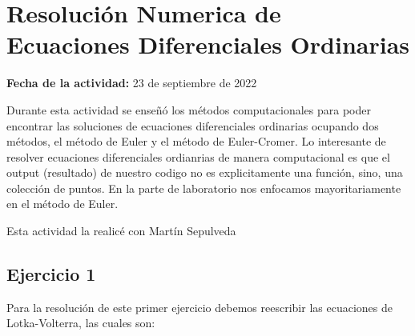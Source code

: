 \documentclass[../portafolio.tex]{subfiles}
\begin{document}


\section{Resoluci\'on Numerica de Ecuaciones Diferenciales Ordinarias}   %

\hfill \textbf{Fecha de la actividad:} 23 de septiembre de 2022

\medskip

Durante esta actividad se ense\~n\'o los m\'etodos computacionales para poder encontrar las soluciones de ecuaciones diferenciales ordinarias ocupando dos m\'etodos, el m\'etodo de Euler y el m\'etodo de Euler-Cromer. Lo interesante de resolver ecuaciones diferenciales ordianrias de manera computacional es que el output (resultado) de nuestro codigo no es explicitamente una funci\'on, sino, una colecci\'on de puntos. En la parte de laboratorio nos enfocamos mayoritariamente en el m\'etodo de Euler.

Esta actividad la realic\'e con Mart\'in Sepulveda
	\subsection{Ejercicio 1}
		Para la resoluci\'on de este primer ejercicio debemos reescribir las ecuaciones de Lotka-Volterra, las cuales son: 
			
\end{document}
